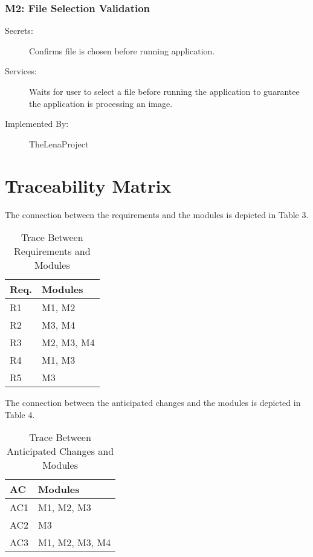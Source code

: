 \documentclass[12pt, titlepage]{article}
\begin{document}
\subsubsection{M2: File Selection Validation}

\begin{description}
	\item[Secrets:]  Confirms file is chosen before running application.
	\item[Services:] Waits for user to select a file before running the application to guarantee the application is processing an image.
	\item[Implemented By:] TheLenaProject
\end{description}

\section{Traceability Matrix} \label{SecTM}

The connection between the requirements and the modules is depicted in Table 3.

\begin{table}[H]
\centering
\begin{tabular}{p{} p{}}
\toprule
\textbf{Req.} & \textbf{Modules}\\
\midrule
R1 & M1, M2 \\
R2 & M3, M4 \\
R3 & M2, M3, M4 \\
R4 & M1, M3 \\
R5 & M3 \\
\bottomrule
\end{tabular}
\caption{Trace Between Requirements and Modules}
\label{TblRT}
\end{table}

The connection between the anticipated changes and the modules is depicted in
Table 4.

\begin{table}[H]
\centering
\begin{tabular}{p{} p{}}
\toprule
\textbf{AC} & \textbf{Modules}\\
\midrule
AC1 & M1, M2, M3\\
AC2 & M3\\
AC3 & M1, M2, M3, M4\\

\bottomrule
\end{tabular}
\caption{Trace Between Anticipated Changes and Modules}
\label{TblACT}
\end{table}
\end{document}
